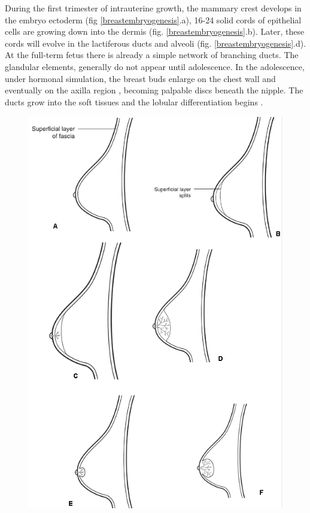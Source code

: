  During the first trimester of intrauterine growth,  the mammary crest develops in the embryo ectoderm (fig \ref{breastembryogenesis}.a), 16-24 solid cords of epithelial cells are growing down into the dermis (fig. \ref{breastembryogenesis}.b). Later, these cords will evolve in the lactiferous ducts and alveoli (fig. \ref{breastembryogenesis}.d). At the full-term fetus there is already a simple network of branching ducts. The glandular elements, generally do not appear until adolescence. In the adolescence, under hormonal simulation, the breast buds enlarge on the chest wall and eventually on the axilla region , becoming palpable discs beneath the nipple. The ducts grow into the soft tissues and the lobular differentiation begins \cite{kopans_daniel_b_breast_2007}. 

\begin{center}
\begin{figure}[!h]
\includegraphics[height=0.7\textheight,keepaspectratio]{figures/breastEvol_fascia.png} 

\end{figure}
\end{center}
